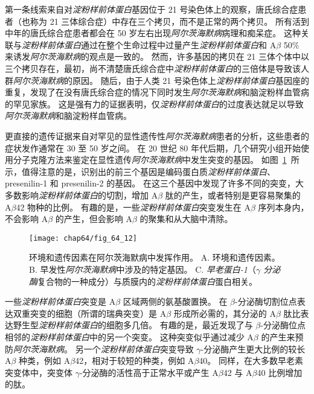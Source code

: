 第一条线索来自对\textit{淀粉样前体蛋白}基因位于 21 号染色体上的观察，唐氏综合症患者（也称为 21 三体综合症）中存在三个拷贝，而不是正常的两个拷贝。
所有活到中年的唐氏综合症患者都会在 50 岁左右出现\textit{阿尔茨海默病}病理和痴呆症。
这种关联与\textit{淀粉样前体蛋白}通过在整个生命过程中过量产生\textit{淀粉样前体蛋白}和 A$\beta$ 50\% 来诱发\textit{阿尔茨海默病}的观点是一致的。
然而，许多基因的拷贝在 21 三体个体中以三个拷贝存在，最初，尚不清楚唐氏综合症中\textit{淀粉样前体蛋白}的三倍体是导致该人群\textit{阿尔茨海默病}的原因。
随后，由于人类 21 号染色体上\textit{淀粉样前体蛋白}基因座的重复，发现了在没有唐氏综合症的情况下同时发生\textit{阿尔茨海默病}和脑淀粉样血管病的罕见家族。
这是强有力的证据表明，仅\textit{淀粉样前体蛋白}的过度表达就足以导致\textit{阿尔茨海默病}和脑淀粉样血管病。


更直接的遗传证据来自对罕见的显性遗传性\textit{阿尔茨海默病}患者的分析，这些患者的症状发作通常在 30 至 50 岁之间。
在 20 世纪 80 年代后期，几个研究小组开始使用分子克隆方法来鉴定在显性遗传\textit{阿尔茨海默病}中发生突变的基因。
如图~\ref{fig:64_12}~所示，值得注意的是，识别出的前三个基因是编码蛋白质\textit{淀粉样前体蛋白}、presenilin-1 和 presenilin-2 的基因。
在这三个基因中发现了许多不同的突变，大多数影响\textit{淀粉样前体蛋白}的切割，增加 A$\beta$ 肽的产生，或者特别是更容易聚集的 A$\beta$42 物种的比例。
有趣的是，一些\textit{淀粉样前体蛋白}突变发生在 A$\beta$ 序列本身内，不会影响 A$\beta$ 的产生，但会影响 A$\beta$ 的聚集和从大脑中清除。


\begin{figure}[htbp]
	\centering
	\texttt{[image: chap64/fig\_64\_12]}
	\caption{环境和遗传因素在阿尔茨海默病中发挥作用。
		A. 环境和遗传因素。
		B. 早发性\textit{阿尔茨海默病}中涉及的特定基因。
		C. \textit{早老蛋白-1}（\textit{$\gamma$ 分泌酶}复合物的一种成分）与质膜内的\textit{淀粉样前体蛋白}蛋白相关。}
	\label{fig:64_12}
\end{figure}


一些\textit{淀粉样前体蛋白}突变是 A$\beta$ 区域两侧的氨基酸置换。
在 $\beta$-分泌酶切割位点表达双重突变的细胞（所谓的瑞典突变）是 A$\beta$ 形成所必需的，其分泌的 A$\beta$ 肽比表达野生型\textit{淀粉样前体蛋白}的细胞多几倍。
有趣的是，最近发现了与 $\beta$-分泌酶位点相邻的\textit{淀粉样前体蛋白}中的另一个突变。
这种突变似乎通过减少 A$\beta$ 的产生来预防\textit{阿尔茨海默病}。
另一个\textit{淀粉样前体蛋白}突变导致 $\gamma$-分泌酶产生更大比例的较长 A$\beta$ 种类，例如 A$\beta$42，相对于较短的种类，例如 A$\beta$40。
同样，在大多数早老素突变体中，突变体 $\gamma$-分泌酶的活性高于正常水平或产生 A$\beta$42 与 A$\beta$40 比例增加的肽。


